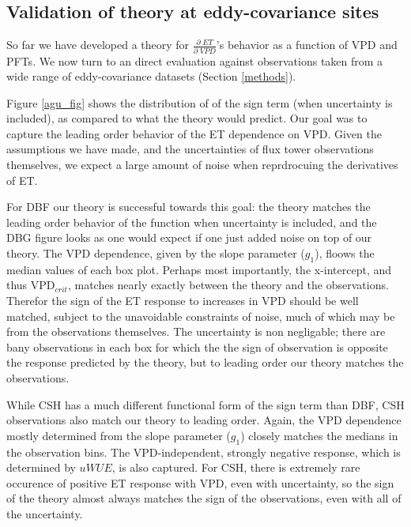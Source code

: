 \documentclass[draft,linenumbers]{agujournal}
\begin{document}
\subsection{Validation of theory at eddy-covariance sites}
\label{testing}
So far we have developed a theory for $\frac{\partial \; ET}{\partial \; VPD}$'s behavior as a function of VPD and PFTs. We now turn to an direct evaluation against observations taken from a wide range of eddy-covariance datasets (Section \ref{methods}).

Figure \ref{agu_fig} shows the distribution of of the sign term (when uncertainty is included), as compared to what the theory would predict. Our goal was to capture the leading order behavior of the ET dependence on VPD. Given the assumptions we have made, and the uncertainties of flux tower observations themselves, we expect a large amount of noise when reprdrocuing the derivatives of ET.

For DBF our theory is successful towards this goal: the theory matches the leading order behavior of the function when uncertainty is included, and the DBG figure looks as one would expect if one just added noise on top of our theory. The VPD dependence, given by the slope parameter ($g_1$), floows the median values of each box plot. Perhaps most importantly, the x-intercept, and thus VPD$_{crit}$, matches nearly exactly between the theory and the observations. Therefor the sign of the ET response to increases in VPD should be well matched, subject to the unavoidable constraints of noise, much of which may be from the observations themselves. The uncertainty is non negligable; there are bany observations in each box for which the the sign of observation is opposite the response predicted by the theory, but to leading order our theory matches the observations. 

While CSH has a much different functional form of the sign term than DBF, CSH observations also match our theory to leading order. Again, the VPD dependence mostly determined from the slope parameter ($g_1$) closely matches the medians in the observation bins. The VPD-independent, strongly negative response, which is determined by $uWUE$, is also captured. For CSH, there is extremely rare occurence of positive ET response with VPD, even with uncertainty, so the sign of the theory almost always matches the sign of the observations, even with all of the uncertainty.
\end{document}
